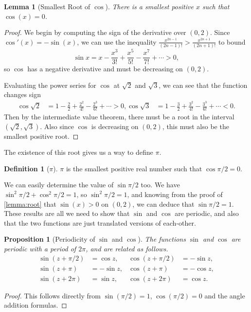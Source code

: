 \documentclass[11pt, a4paper]{article}
\newtheorem{proposition}[theorem]{Proposition}
\newtheorem{lemma}[theorem]{Lemma}
\theoremstyle{definition}
\newtheorem{definition}[theorem]{Definition}
\begin{document}
\begin{lemma}[Smallest Root of $\cos$]\label{lemma:root}
	There is a smallest positive $x$ such that $\cos(x) = 0$.
\end{lemma}
\begin{proof}
	We begin by computing the sign of the derivative over $(0, 2)$.
	Since $\cos'(x) = -\sin(x)$, we can use the inequality $\frac{x^{2n - 1}}{(2n - 1)!} > \frac{x^{2n + 1}}{(2n + 1)!}$ to bound
	$$
	\sin x = x - \frac{x^3}{3!} + \frac{x^5}{5!} - \frac{x^7}{7!} + \cdots > 0,
	$$
	so $\cos$ has a negative derivative and must be decreasing on $(0, 2)$.


	Evaluating the power series for $\cos$ at $\sqrt{2}$ and $\sqrt{3}$, we can see that the function changes sign
\begin{align*}
	\cos \sqrt{2} &= 1 - \frac{2}{2} + \frac{2^2}{4!} - \frac{2^3}{6!} +  \cdots > 0, 
	\cos \sqrt{3} &= 1 - \frac{3}{2} + \frac{3^2}{4!} - \frac{3^3}{6!} + \cdots < 0.
\end{align*}
Then by the intermediate value theorem, there must be a root in the interval $(\sqrt{2}, \sqrt{3})$. Also since $\cos$ is decreasing on $(0, 2)$, this must also be the smallest positive root.
\end{proof}

The existence of this root gives us a way to define $\pi$.

\begin{definition}[$\pi$]
	 $\pi$ is the smallest positive real number such that $\cos \pi/2 = 0$.
\end{definition}

We can easily determine the value of $\sin \pi/2$ too. We have $\sin^2 \pi/2 + \cos^2 \pi/2 = 1$, so $\sin^2 \pi/2 = 1$, and 
knowing from the proof of \autoref{lemma:root} that $\sin(x) > 0$ on $(0, 2)$, we can deduce that $\sin \pi/2 = 1$. These results are all we need to show that $\sin$ and $\cos$ are periodic, and also that the two functions are just translated versions of each-other.

\begin{proposition}[Periodicity of $\sin$ and $\cos$]
	The functions $\sin$ and $\cos$ are periodic with a period of $2 \pi$, and are related as follows.
	\begin{align*}
			\sin (z+ \pi/2)& =\cos z,   & \cos (z+ \pi/2)&=-\sin z, \\
			\sin (z+\pi)&=-\sin z, & \cos (z+\pi)&=-\cos z, \\
			\sin (z+2 \pi)&=\sin z, & \cos (z+2 \pi)&=\cos z.
	\end{align*}
\end{proposition}
\begin{proof}
	This follows directly from $\sin(\pi/2) = 1$, $\cos(\pi/2) = 0$ and the angle addition formulas.
\end{proof}
\end{document}
